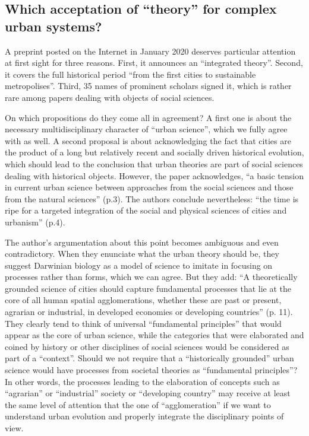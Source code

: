 \documentclass[10pt,letterpaper]{article}
\begin{document}
\subsection{Which acceptation of ``theory'' for complex urban systems?}

A preprint posted on the Internet in January 2020 \citep{lobo2020urban} deserves particular attention at first sight for three reasons. First, it announces an ``integrated theory''. Second, it covers the full historical period ``from the first cities to sustainable metropolises''. Third, 35 names of prominent scholars signed it, which is rather rare among papers dealing with objects of social sciences.

On which propositions do they come all in agreement? A first one is about the necessary multidisciplinary character of ``urban science'', which we fully agree with as well. A second proposal is about acknowledging the fact that cities are the product of a long but relatively recent and socially driven historical evolution, which should lead to the conclusion that urban theories are part of social sciences dealing with historical objects. However, the paper acknowledges, ``a basic tension in current urban science between approaches from the social sciences and those from the natural sciences'' (p.3). The authors conclude nevertheless: ``the time is ripe for a targeted integration of the social and physical sciences of cities and urbanism'' (p.4).

The author’s argumentation about this point becomes ambiguous and even contradictory. When they enunciate what the urban theory should be, they suggest Darwinian biology as a model of science to imitate in focusing on processes rather than forms, which we can agree. But they add: ``A theoretically grounded science of cities should capture fundamental processes that lie at the core of all human spatial agglomerations, whether these are past or present, agrarian or industrial, in developed economies or developing countries'' (p. 11). They clearly tend to think of universal ``fundamental principles'' that would appear as the core of urban science, while the categories that were elaborated and coined by history or other disciplines of social sciences would be considered as part of a “context”. Should we not require that a “historically grounded” urban science would have processes from societal theories as ``fundamental principles''? In other words, the processes leading to the elaboration of concepts such as ``agrarian'' or ``industrial'' society or ``developing country'' may receive at least the same level of attention that the one of ``agglomeration'' if we want to understand urban evolution and properly integrate the disciplinary points of view.
\end{document}
